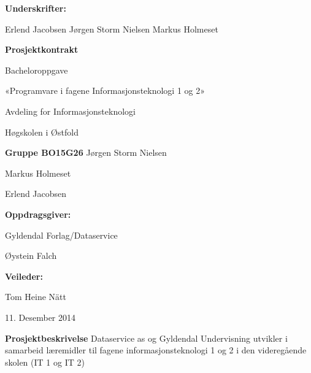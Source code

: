 \vspace{40pt}

\begin{center} \textbf{Underskrifter:}

\vspace{20pt}
Erlend Jacobsen \hspace{50pt} Jørgen Storm Nielsen \hspace{50pt} Markus Holmeset
\end{center}

\newpage





\begin{center}

\begin{Huge}

\hspace{55pt}\textbf{Prosjektkontrakt}\newline

\vspace{20pt}
Bacheloroppgave

«Programvare i fagene Informasjonsteknologi 1 og 2»

Avdeling for Informasjonsteknologi

Høgskolen i Østfold
\vspace{20pt}
\end{Huge}

\begin{LARGE}
\textbf{Gruppe BO15G26}
Jørgen Storm Nielsen

Markus Holmeset

Erlend Jacobsen

\vspace{20pt}
\textbf{Oppdragsgiver:}

Gyldendal Forlag/Dataservice

Øystein Falch

\vspace{20pt}
\textbf{Veileder:}

Tom Heine Nätt



\vspace{40pt}
11. Desember 2014
\end{LARGE}

\end{center}

\newpage

\large
\vspace{40pt}
\hspace{-17pt}\textbf{Prosjektbeskrivelse}\newline
Dataservice as og Gyldendal Undervisning utvikler i
samarbeid læremidler til fagene informasjonsteknologi 1 og 2
i den videregående skolen (IT 1 og IT 2)\newline

